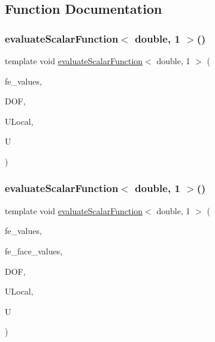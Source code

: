 \subsection{Function Documentation}
\mbox{\label{function_evaluations_8cc_a436a979f117d9baba72821197a739e19}} 
\subsubsection{\texorpdfstring{evaluate\+Scalar\+Function$<$ double, 1 $>$()}{evaluateScalarFunction< double, 1 >()}\hspace{0.1cm}{\footnotesize\ttfamily [1/2]}}
{\footnotesize\ttfamily template void \mbox{\hyperlink{group___evaluation_functions_ga2e2fbeb2173113c6889c73bbb7304789}{evaluate\+Scalar\+Function}}$<$ double, 1 $>$ (\begin{DoxyParamCaption}\item[{const F\+E\+Values$<$ 1 $>$ \&}]{fe\+\_\+values,  }\item[{unsigned int}]{D\+OF,  }\item[{Table$<$ 1, double $>$ \&}]{U\+Local,  }\item[{Table$<$ 1, double $>$ \&}]{U }\end{DoxyParamCaption})}

\mbox{\label{function_evaluations_8cc_a1b7c8170a7edbde30679da8b7f16d53b}} 
\subsubsection{\texorpdfstring{evaluate\+Scalar\+Function$<$ double, 1 $>$()}{evaluateScalarFunction< double, 1 >()}\hspace{0.1cm}{\footnotesize\ttfamily [2/2]}}
{\footnotesize\ttfamily template void \mbox{\hyperlink{group___evaluation_functions_ga2e2fbeb2173113c6889c73bbb7304789}{evaluate\+Scalar\+Function}}$<$ double, 1 $>$ (\begin{DoxyParamCaption}\item[{const F\+E\+Values$<$ 1 $>$ \&}]{fe\+\_\+values,  }\item[{const F\+E\+Face\+Values$<$ 1 $>$ \&}]{fe\+\_\+face\+\_\+values,  }\item[{unsigned int}]{D\+OF,  }\item[{Table$<$ 1, double $>$ \&}]{U\+Local,  }\item[{Table$<$ 1, double $>$ \&}]{U }\end{DoxyParamCaption})}

